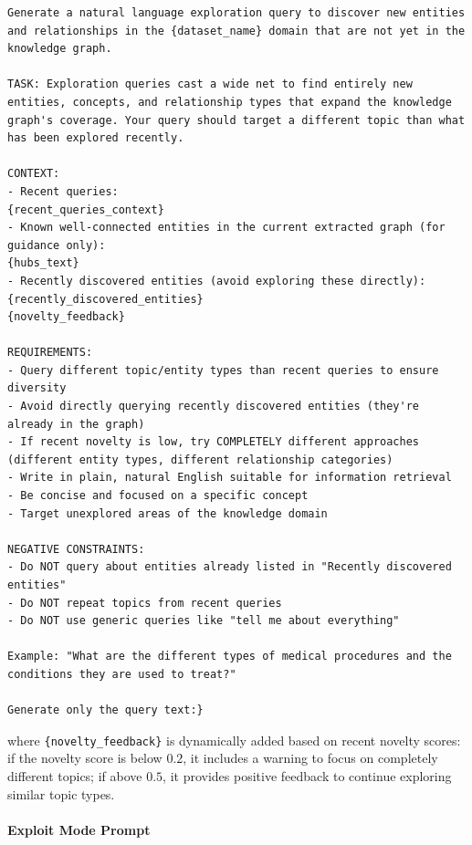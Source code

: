 \begin{tcolorbox}[
  title={Explore prompt template},
  colback=gray!3,
  colframe=gray!40,
  boxrule=0.5pt,
  arc=2pt,
  left=5pt,right=5pt,top=4pt,bottom=4pt,
  breakable
]\label{explore_prompt}
\begin{Verbatim}[fontsize=\footnotesize, breaklines=true, breakanywhere=true, breaksymbolleft={}]
Generate a natural language exploration query to discover new entities and relationships in the {dataset_name} domain that are not yet in the knowledge graph.

TASK: Exploration queries cast a wide net to find entirely new entities, concepts, and relationship types that expand the knowledge graph's coverage. Your query should target a different topic than what has been explored recently.

CONTEXT:
- Recent queries:
{recent_queries_context}
- Known well-connected entities in the current extracted graph (for guidance only):
{hubs_text}
- Recently discovered entities (avoid exploring these directly): {recently_discovered_entities}
{novelty_feedback}

REQUIREMENTS:
- Query different topic/entity types than recent queries to ensure diversity
- Avoid directly querying recently discovered entities (they're already in the graph)
- If recent novelty is low, try COMPLETELY different approaches (different entity types, different relationship categories)
- Write in plain, natural English suitable for information retrieval
- Be concise and focused on a specific concept
- Target unexplored areas of the knowledge domain

NEGATIVE CONSTRAINTS:
- Do NOT query about entities already listed in "Recently discovered entities"
- Do NOT repeat topics from recent queries
- Do NOT use generic queries like "tell me about everything"

Example: "What are the different types of medical procedures and the conditions they are used to treat?"

Generate only the query text:}
\end{Verbatim}
\end{tcolorbox}

where \texttt{\{novelty\_feedback\}} is dynamically added based on recent novelty scores: if the novelty score is below $0.2$, it includes a warning to focus on completely different topics; if above $0.5$, it provides positive feedback to continue exploring similar topic types.

\paragraph{Exploit Mode Prompt}


